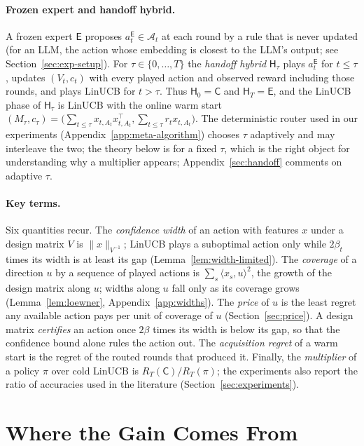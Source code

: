 \documentclass[anon]{alt2027} %
\newcommand{\Cold}{\mathsf{C}}
\newcommand{\Exp}{\mathsf{E}}
\newcommand{\Hyb}{\mathsf{H}}
\begin{document}
\paragraph{Frozen expert and handoff hybrid.}
A frozen expert $\Exp$ proposes $a_t^{\Exp}\in\mathcal A_t$ at each round by a
rule that is never updated (for an LLM, the action whose embedding is closest
to the LLM's output; see Section~\ref{sec:exp-setup}). For $\tau\in\{0,\dots,T\}$
the \emph{handoff hybrid} $\Hyb_\tau$ plays $a_t^{\Exp}$ for $t\le\tau$, updates
$(V_t,c_t)$ with every played action and observed reward including those
rounds, and plays LinUCB for $t>\tau$. Thus $\Hyb_0=\Cold$ and $\Hyb_T=\Exp$,
and the LinUCB phase of $\Hyb_\tau$ is LinUCB with the online warm start
$(M_\tau,c_\tau)=\bigl(\sum_{t\le\tau}x_{t,A_t}x_{t,A_t}^\top,\sum_{t\le\tau}r_tx_{t,A_t}\bigr)$.
The deterministic router used in our experiments
(Appendix~\ref{app:meta-algorithm}) chooses $\tau$ adaptively and may
interleave the two; the theory below is for a fixed $\tau$, which is the
right object for understanding why a multiplier appears; Appendix~\ref{sec:handoff}
comments on adaptive $\tau$.

\paragraph{Key terms.}
Six quantities recur. The \emph{confidence width} of an action with features
$x$ under a design matrix $V$ is $\|x\|_{V^{-1}}$; LinUCB plays a suboptimal
action only while $2\beta_t$ times its width is at least its gap
(Lemma~\ref{lem:width-limited}). The \emph{coverage} of a direction $u$ by a
sequence of played actions is $\sum_s\langle x_s,u\rangle^2$, the growth of the
design matrix along $u$; widths along $u$ fall only as its coverage grows
(Lemma~\ref{lem:loewner}, Appendix~\ref{app:widths}). The \emph{price} of $u$
is the least regret any available action pays per unit of coverage of $u$
(Section~\ref{sec:price}). A design
matrix \emph{certifies} an action once $2\beta$ times its width is below its
gap, so that the confidence bound alone rules the action out. The
\emph{acquisition regret} of a warm start is the regret of the routed rounds
that produced it. Finally, the \emph{multiplier} of a policy $\pi$ over cold
LinUCB is $R_T(\Cold)/R_T(\pi)$; the experiments also report the ratio of
accuracies used in the literature (Section~\ref{sec:experiments}).


\section{Where the Gain Comes From}
\label{sec:decomp}
\end{document}
